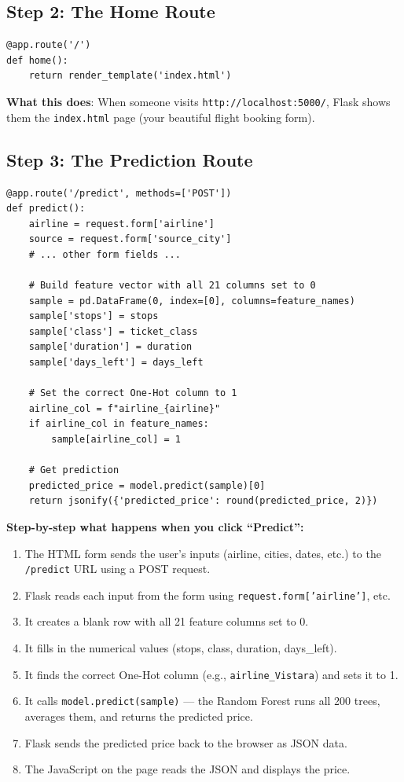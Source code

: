 \documentclass[12pt, a4paper]{article}
\begin{document}
\subsection{Step 2: The Home Route}
\begin{lstlisting}
@app.route('/')
def home():
    return render_template('index.html')
\end{lstlisting}
\textbf{What this does}: When someone visits \texttt{http://localhost:5000/}, Flask shows them the \texttt{index.html} page (your beautiful flight booking form).

\subsection{Step 3: The Prediction Route}
\begin{lstlisting}
@app.route('/predict', methods=['POST'])
def predict():
    airline = request.form['airline']
    source = request.form['source_city']
    # ... other form fields ...

    # Build feature vector with all 21 columns set to 0
    sample = pd.DataFrame(0, index=[0], columns=feature_names)
    sample['stops'] = stops
    sample['class'] = ticket_class
    sample['duration'] = duration
    sample['days_left'] = days_left

    # Set the correct One-Hot column to 1
    airline_col = f"airline_{airline}"
    if airline_col in feature_names:
        sample[airline_col] = 1

    # Get prediction
    predicted_price = model.predict(sample)[0]
    return jsonify({'predicted_price': round(predicted_price, 2)})
\end{lstlisting}

\begin{codewalkbox}
    \textbf{Step-by-step what happens when you click ``Predict'':}
    \begin{enumerate}
        \item The HTML form sends the user's inputs (airline, cities, dates, etc.) to the \texttt{/predict} URL using a POST request.
        \item Flask reads each input from the form using \texttt{request.form['airline']}, etc.
        \item It creates a blank row with all 21 feature columns set to 0.
        \item It fills in the numerical values (stops, class, duration, days\_left).
        \item It finds the correct One-Hot column (e.g., \texttt{airline\_Vistara}) and sets it to 1.
        \item It calls \texttt{model.predict(sample)} — the Random Forest runs all 200 trees, averages them, and returns the predicted price.
        \item Flask sends the predicted price back to the browser as JSON data.
        \item The JavaScript on the page reads the JSON and displays the price.
    \end{enumerate}
\end{codewalkbox}
\end{document}
